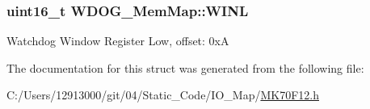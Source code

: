 \subsubsection[{W\+I\+N\+L}]{\setlength{\rightskip}{0pt plus 5cm}uint16\+\_\+t W\+D\+O\+G\+\_\+\+Mem\+Map\+::\+W\+I\+N\+L}\label{struct_w_d_o_g___mem_map_af238938251c1f5904a215c8a4ed1b74d}
Watchdog Window Register Low, offset\+: 0x\+A 

The documentation for this struct was generated from the following file\+:\begin{DoxyCompactItemize}
\item 
C\+:/\+Users/12913000/git/04/\+Static\+\_\+\+Code/\+I\+O\+\_\+\+Map/\hyperlink{_m_k70_f12_8h}{M\+K70\+F12.\+h}\end{DoxyCompactItemize}
